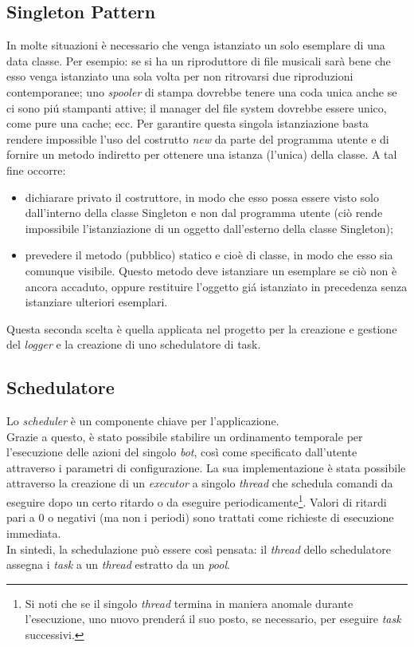 \subsection{Singleton Pattern}
In molte situazioni \`e necessario che venga istanziato un solo esemplare di una data classe. Per esempio: se si ha un riproduttore di file musicali sar\`a bene che esso venga istanziato una sola volta per non ritrovarsi due riproduzioni contemporanee; uno \textit{spooler} di stampa dovrebbe tenere una coda unica anche se ci sono pi\'u
stampanti attive; il manager del file system dovrebbe essere unico, come pure una cache; ecc. Per garantire questa singola istanziazione basta rendere impossible l'uso del costrutto \textit{new} da parte del programma utente e di fornire un metodo indiretto per ottenere una istanza (l'unica) della classe.
A tal fine occorre:
\begin{itemize}
\item dichiarare privato il costruttore, in modo che esso possa essere visto solo dall'interno della classe Singleton e non dal programma utente (ci\`o rende impossibile l'istanziazione di un oggetto dall'esterno della classe Singleton);
\item prevedere il metodo (pubblico) statico e cio\`e di classe, in modo che esso sia comunque visibile. Questo metodo deve istanziare un esemplare se ci\`o non \`e ancora accaduto, oppure restituire l'oggetto gi\'a istanziato in precedenza senza istanziare ulteriori esemplari.
\end{itemize}
Questa seconda scelta \`e quella applicata nel progetto per la creazione e gestione del \textit{logger} e la creazione di uno schedulatore di task.

\vspace*{0.5cm}
\subsection{Schedulatore}
Lo \textit{scheduler} \`e un componente chiave per l'applicazione. \\
Grazie a questo, \`e stato possibile stabilire un ordinamento temporale per l'esecuzione delle azioni del singolo \textit{bot}, cos\`i come specificato dall'utente attraverso i parametri di configurazione. La sua implementazione \`e stata possibile attraverso la creazione di un \textit{executor} a singolo \textit{thread} che schedula comandi da eseguire dopo un certo ritardo o da eseguire periodicamente\footnote{Si noti che se il singolo \textit{thread} termina in maniera anomale durante l'esecuzione, uno nuovo prender\'a il suo posto, se necessario, per eseguire \textit{task} successivi.}. Valori di ritardi pari a 0 o negativi (ma non i periodi) sono trattati come richieste di esecuzione immediata. \\
In sintedi, la schedulazione pu\`o essere cos\`i pensata: il \textit{thread} dello schedulatore assegna i \textit{task} a un \textit{thread} estratto da un \textit{pool}.

